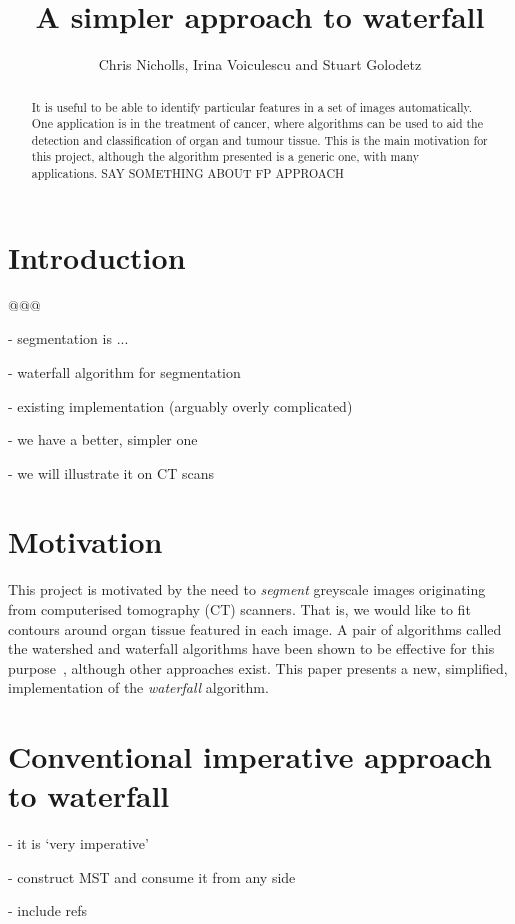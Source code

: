 \documentclass{jfp}
\title{\LARGE \bf
A simpler approach to waterfall
}
\author{Chris Nicholls, Irina Voiculescu and Stuart Golodetz
}
\begin{document}
\maketitle
\pagestyle{empty}

\begin{abstract}
It is useful to be able to identify particular features in a set of
images automatically. One application is in the treatment of cancer,
where algorithms can be used to aid the detection and classification
of organ and tumour tissue. This is the main motivation for this
project, although the algorithm presented is a generic one, with many
applications. SAY SOMETHING ABOUT FP APPROACH
\end{abstract}

\section{Introduction}

@@@

 - segmentation is ...

 - waterfall algorithm for segmentation

 - existing implementation (arguably overly complicated)

 - we have a better, simpler one

 - we will illustrate it on CT scans


\section{Motivation}

 This project is motivated by the need to {\em segment\/} greyscale
 images originating from computerised tomography (CT) scanners. That
 is, we would like to fit contours around organ tissue featured in
 each image. A pair of algorithms called the watershed and waterfall
 algorithms have been shown to be effective for this
 purpose~\cite{golodetz}, although other approaches exist. This paper
 presents a new, simplified, implementation of the {\em waterfall\/}
 algorithm.

\section{Conventional imperative approach to waterfall}

 - it is `very imperative'

 - construct MST and consume it from any side

 - include refs
\end{document}
